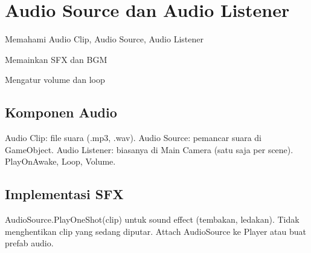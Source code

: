 \section{Audio Source dan Audio Listener}

\begin{learningoutcomes}
\item Memahami Audio Clip, Audio Source, Audio Listener
\item Memainkan SFX dan BGM
\item Mengatur volume dan loop
\end{learningoutcomes}

\subsection{Komponen Audio}

Audio Clip: file suara (.mp3, .wav). Audio Source: pemancar suara di GameObject. Audio Listener: biasanya di Main Camera (satu saja per scene). PlayOnAwake, Loop, Volume.

\subsection{Implementasi SFX}

AudioSource.PlayOneShot(clip) untuk sound effect (tembakan, ledakan). Tidak menghentikan clip yang sedang diputar. Attach AudioSource ke Player atau buat prefab audio.
